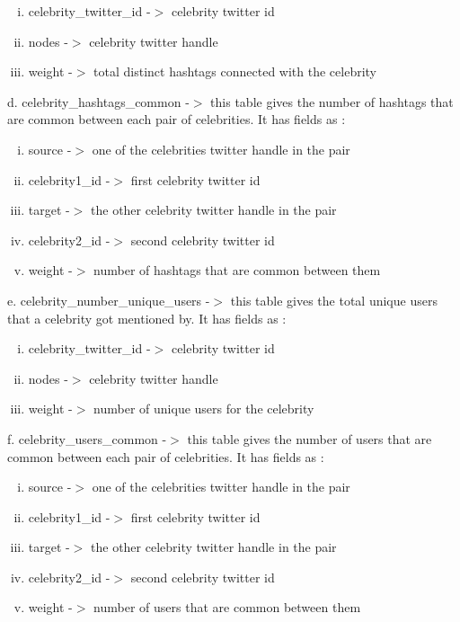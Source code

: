 \documentclass[runningheads,a4paper]{llncs}
\begin{document}
\begin{itemize}
\begin{enumerate}[i.  ]
\addtolength{\itemindent}{1cm}
\item celebrity\_twitter\_id -$>$ celebrity twitter id
\item nodes -$>$ celebrity twitter handle
\item weight -$>$ total distinct hashtags connected with the celebrity
\end{enumerate}
\vspace{0.1in}
\subitem d. celebrity\_hashtags\_common -$>$ this table gives the number of hashtags that are common between each pair of celebrities. It has fields as :

\begin{enumerate}[i.  ]
\addtolength{\itemindent}{1cm}
\item source -$>$ one of the celebrities twitter handle in the pair
\item celebrity1\_id -$>$ first celebrity twitter id
\item target -$>$ the other celebrity twitter handle in the pair
\item celebrity2\_id -$>$ second celebrity twitter id
\item weight -$>$ number of hashtags that are common between them
\end{enumerate}
\vspace{0.1in}
\subitem e. celebrity\_number\_unique\_users -$>$ this table gives the total unique users that a celebrity got mentioned by. It has fields as :

\begin{enumerate}[i.  ]
\addtolength{\itemindent}{1cm}
\item celebrity\_twitter\_id -$>$ celebrity twitter id
\item nodes -$>$ celebrity twitter handle
\item weight -$>$ number of unique users for the celebrity
\end{enumerate}
\vspace{0.1in}
\subitem f. celebrity\_users\_common -$>$ this table gives the number of users that are common between each pair of celebrities. It has fields as :

\begin{enumerate}[i.  ]
\addtolength{\itemindent}{1cm}
\item source -$>$ one of the celebrities twitter handle in the pair
\item celebrity1\_id -$>$ first celebrity twitter id
\item target -$>$ the other celebrity twitter handle in the pair
\item celebrity2\_id -$>$ second celebrity twitter id
\item weight -$>$ number of users that are common between them
\end{enumerate}


\end{itemize}
\end{document}
